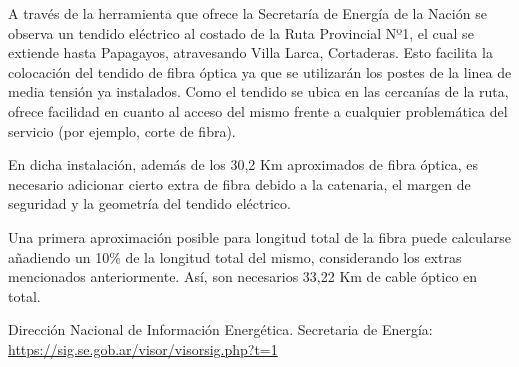  


A través de la herramienta que ofrece la Secretaría de Energía de la Nación se observa un tendido eléctrico al costado de la Ruta Provincial Nº1, el cual se extiende hasta Papagayos, atravesando Villa Larca, Cortaderas. Esto facilita la colocación del tendido de fibra óptica ya que se utilizarán los postes de la linea de media tensión ya instalados.
Como el tendido se ubica en las cercanías de la ruta, ofrece facilidad en cuanto al acceso del mismo frente a cualquier problemática del servicio (por ejemplo, corte de fibra).



En dicha instalación, además de los 30,2 Km aproximados de fibra óptica, es necesario adicionar cierto extra de fibra debido a la catenaria, el margen de seguridad y la geometría del tendido eléctrico.

Una primera aproximación posible para longitud total de la fibra puede calcularse añadiendo un 10\% de la longitud total del mismo, considerando los extras mencionados anteriormente. Así, son necesarios 33,22 Km de cable óptico en total.






\newpage

\begin{thebibliography}{99}
Dirección Nacional de Información Energética. Secretaria de Energía: \url{https://sig.se.gob.ar/visor/visorsig.php?t=1}

\end{thebibliography}


\newpage